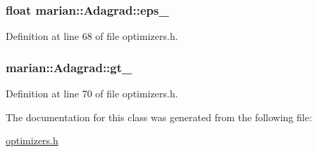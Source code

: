 \subsubsection[{\texorpdfstring{eps\+\_\+}{eps_}}]{\setlength{\rightskip}{0pt plus 5cm}float marian\+::\+Adagrad\+::eps\+\_\+\hspace{0.3cm}{\ttfamily [private]}}\hypertarget{classmarian_1_1Adagrad_a1892a60789f7ef407f40222669ca22f7}{}\label{classmarian_1_1Adagrad_a1892a60789f7ef407f40222669ca22f7}


Definition at line 68 of file optimizers.\+h.

\subsubsection[{\texorpdfstring{gt\+\_\+}{gt_}}]{ marian\+::\+Adagrad\+::gt\+\_\+\hspace{0.3cm}{\ttfamily [private]}}\hypertarget{classmarian_1_1Adagrad_a0e809e1fd59eb3033b5a04c7c3122b14}{}\label{classmarian_1_1Adagrad_a0e809e1fd59eb3033b5a04c7c3122b14}


Definition at line 70 of file optimizers.\+h.



The documentation for this class was generated from the following file\+:\begin{DoxyCompactItemize}
\item 
\hyperlink{optimizers_8h}{optimizers.\+h}\end{DoxyCompactItemize}
